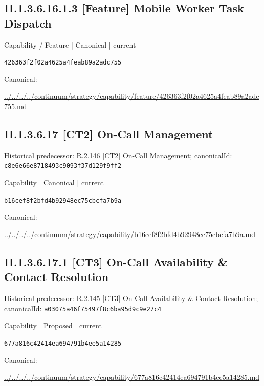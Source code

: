 \documentclass[10pt,a4paper]{article}
\begin{document}
\subsection*{II.1.3.6.16.1.3 [Feature] Mobile Worker Task Dispatch}
\label{element-426363f2f02a4625a4feab89a2adc755}
{\small Capability / Feature | Canonical | current}\par
\texttt{426363f2f02a4625a4feab89a2adc755}\par
Canonical: \par
{\footnotesize\url{../../../../continuum/strategy/capability/feature/426363f2f02a4625a4feab89a2adc755.md}}\par
\subsection*{II.1.3.6.17 [CT2] On-Call Management}
Historical predecessor: \hyperref[element-c8e6e66e8718493c9093f37d129f9ff2]{R.2.146 [CT2] On-Call Management}; canonicalId: \texttt{c8e6e66e8718493c9093f37d129f9ff2}\par
\label{element-b16cef8f2bfd4b92948ec75cbcfa7b9a}
{\small Capability | Canonical | current}\par
\texttt{b16cef8f2bfd4b92948ec75cbcfa7b9a}\par
Canonical: \par
{\footnotesize\url{../../../../continuum/strategy/capability/b16cef8f2bfd4b92948ec75cbcfa7b9a.md}}\par
\subsection*{II.1.3.6.17.1 [CT3] On-Call Availability \& Contact Resolution}
Historical predecessor: \hyperref[element-a03075a46f75497f8c6ba95d9c9e27c4]{R.2.145 [CT3] On-Call Availability \& Contact Resolution}; canonicalId: \texttt{a03075a46f75497f8c6ba95d9c9e27c4}\par
\label{element-677a816c42414ea694791b4ee5a14285}
{\small Capability | Proposed | current}\par
\texttt{677a816c42414ea694791b4ee5a14285}\par
Canonical: \par
{\footnotesize\url{../../../../continuum/strategy/capability/677a816c42414ea694791b4ee5a14285.md}}\par
\end{document}
